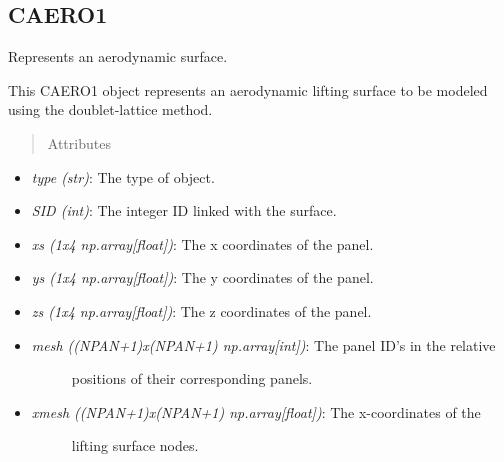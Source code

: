 \documentclass[letterpaper,10pt,english]{sphinxmanual}
\begin{document}
\subsection{CAERO1}
\label{aerodynamics:caero1}

\begin{fulllineitems}
\label{aerodynamics:AeroComBAT.Aerodynamics.CAERO1}
Represents an aerodynamic surface.

This CAERO1 object represents an aerodynamic lifting surface to be modeled
using the doublet-lattice method.
\begin{quote}\begin{description}
\item[{Attributes}] \leavevmode
\end{description}\end{quote}
\begin{itemize}
\item {} 
\emph{type (str)}: The type of object.

\item {} 
\emph{SID (int)}: The integer ID linked with the surface.

\item {} 
\emph{xs (1x4 np.array{[}float{]})}: The x coordinates of the panel.

\item {} 
\emph{ys (1x4 np.array{[}float{]})}: The y coordinates of the panel.

\item {} 
\emph{zs (1x4 np.array{[}float{]})}: The z coordinates of the panel.

\item {} \begin{description}
\item[{\emph{mesh ((NPAN+1)x(NPAN+1) np.array{[}int{]})}: The panel ID's in the relative}] \leavevmode
positions of their corresponding panels.

\end{description}

\item {} \begin{description}
\item[{\emph{xmesh ((NPAN+1)x(NPAN+1) np.array{[}float{]})}: The x-coordinates of the}] \leavevmode
lifting surface nodes.


\end{description}
\end{itemize}
\end{fulllineitems}
\end{document}
